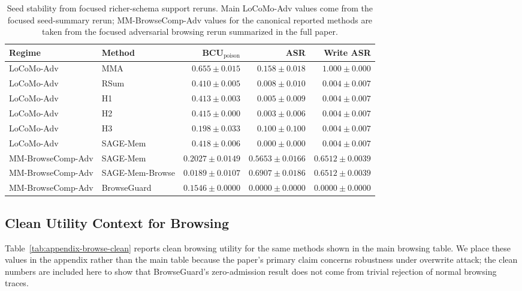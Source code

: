 \documentclass{article}
\begin{document}
\begin{table}[tbp]
\centering
\caption{Seed stability from focused richer-schema support reruns. Main LoCoMo-Adv values come from the focused seed-summary rerun; MM-BrowseComp-Adv values for the canonical reported methods are taken from the focused adversarial browsing rerun summarized in the full paper.}
\label{tab:appendix-seeds}
\small
\setlength{\tabcolsep}{4.0pt}
\renewcommand{\arraystretch}{0.96}
\begin{adjustbox}{max width=\textwidth}
\begin{tabular}{llrrr}
\toprule
Regime & Method & BCU$_{\text{poison}}$ & ASR & Write ASR \\
\midrule
LoCoMo-Adv & MMA & \(0.655 \pm 0.015\) & \(0.158 \pm 0.018\) & \(1.000 \pm 0.000\) \\
LoCoMo-Adv & RSum & \(0.410 \pm 0.005\) & \(0.008 \pm 0.010\) & \(0.004 \pm 0.007\) \\
LoCoMo-Adv & H1 & \(0.413 \pm 0.003\) & \(0.005 \pm 0.009\) & \(0.004 \pm 0.007\) \\
LoCoMo-Adv & H2 & \(0.415 \pm 0.000\) & \(0.003 \pm 0.006\) & \(0.004 \pm 0.007\) \\
LoCoMo-Adv & H3 & \(0.198 \pm 0.033\) & \(0.100 \pm 0.100\) & \(0.004 \pm 0.007\) \\
LoCoMo-Adv & SAGE-Mem & \(0.418 \pm 0.006\) & \(0.000 \pm 0.000\) & \(0.004 \pm 0.007\) \\
\midrule
MM-BrowseComp-Adv & SAGE-Mem & \(0.2027 \pm 0.0149\) & \(0.5653 \pm 0.0166\) & \(0.6512 \pm 0.0039\) \\
MM-BrowseComp-Adv & SAGE-Mem-Browse & \(0.0189 \pm 0.0107\) & \(0.6907 \pm 0.0186\) & \(0.6512 \pm 0.0039\) \\
MM-BrowseComp-Adv & BrowseGuard & \(0.1546 \pm 0.0000\) & \(0.0000 \pm 0.0000\) & \(0.0000 \pm 0.0000\) \\
\bottomrule
\end{tabular}
\end{adjustbox}
\end{table}

\subsection{Clean Utility Context for Browsing}

Table~\ref{tab:appendix-browse-clean} reports clean browsing utility for the same methods shown in the main browsing table. We place these values in the appendix rather than the main table because the paper's primary claim concerns robustness under overwrite attack; the clean numbers are included here to show that BrowseGuard's zero-admission result does not come from trivial rejection of normal browsing traces.
\end{document}
